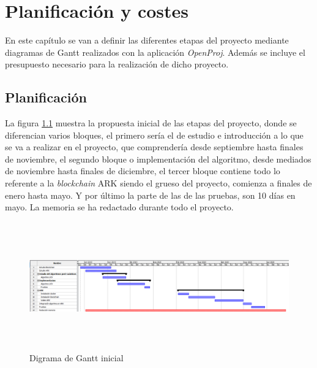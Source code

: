 \chapter{Planificación y costes}


En este capítulo se van a definir las diferentes etapas del proyecto mediante diagramas de Gantt realizados con la aplicación \textit{OpenProj}. Además se incluye el presupuesto necesario para la realización de dicho proyecto.

\section{Planificación}

La figura \ref{fig:gantt-ini} muestra la propuesta inicial de las etapas del proyecto, donde se diferencian varios bloques, el primero sería el de estudio e introducción a lo que se va a realizar en el proyecto, que comprendería desde septiembre hasta finales de noviembre, el segundo bloque o implementación del algoritmo, desde mediados de noviembre hasta finales de diciembre, el tercer bloque contiene todo lo referente a la \textit{blockchain} ARK siendo el grueso del proyecto, comienza a finales de enero hasta mayo. Y por último la parte de las de las pruebas, son 10 días en mayo. La memoria se ha redactado durante todo el proyecto.

\begin{figure}[h]
	\centering
	\hspace*{-2cm}
	\includegraphics[width=18cm,height=5.5cm]{figuras/Gantt_ini.png}
	\caption{Digrama de Gantt inicial}
	\label{fig:gantt-ini}
\end{figure}

